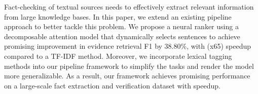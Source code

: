 Fact-checking of textual sources needs to effectively extract relevant information from large knowledge bases. In this paper, we extend an existing pipeline approach to better tackle this problem. We propose a neural ranker using a decomposable attention model that dynamically selects sentences to achieve promising improvement in evidence retrieval F1 by 38.80\%, with (x65) speedup compared to a TF-IDF method. Moreover, we incorporate lexical tagging methods into our pipeline framework to simplify the tasks and render the model more generalizable. As a result, our framework achieves promising performance on a large-scale fact extraction and verification dataset with speedup.
